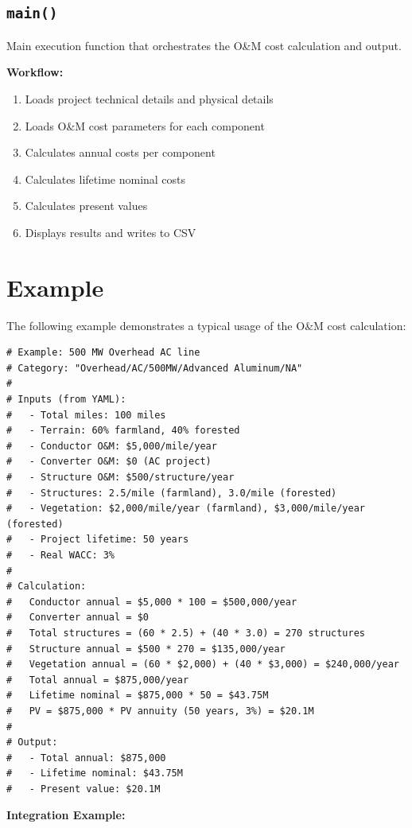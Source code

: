 \documentclass[ctcc_full_documentation.tex]{subfiles}
\begin{document}
\subsection{\texttt{main()}}

Main execution function that orchestrates the O\&M cost calculation and output.

\textbf{Workflow:}
\begin{enumerate}
    \item Loads project technical details and physical details
    \item Loads O\&M cost parameters for each component
    \item Calculates annual costs per component
    \item Calculates lifetime nominal costs
    \item Calculates present values
    \item Displays results and writes to CSV
\end{enumerate}

\section{Example}

The following example demonstrates a typical usage of the O\&M cost calculation:

\begin{lstlisting}
# Example: 500 MW Overhead AC line
# Category: "Overhead/AC/500MW/Advanced Aluminum/NA"
# 
# Inputs (from YAML):
#   - Total miles: 100 miles
#   - Terrain: 60% farmland, 40% forested
#   - Conductor O&M: $5,000/mile/year
#   - Converter O&M: $0 (AC project)
#   - Structure O&M: $500/structure/year
#   - Structures: 2.5/mile (farmland), 3.0/mile (forested)
#   - Vegetation: $2,000/mile/year (farmland), $3,000/mile/year (forested)
#   - Project lifetime: 50 years
#   - Real WACC: 3%
#
# Calculation:
#   Conductor annual = $5,000 * 100 = $500,000/year
#   Converter annual = $0
#   Total structures = (60 * 2.5) + (40 * 3.0) = 270 structures
#   Structure annual = $500 * 270 = $135,000/year
#   Vegetation annual = (60 * $2,000) + (40 * $3,000) = $240,000/year
#   Total annual = $875,000/year
#   Lifetime nominal = $875,000 * 50 = $43.75M
#   PV = $875,000 * PV annuity (50 years, 3%) = $20.1M
#
# Output:
#   - Total annual: $875,000
#   - Lifetime nominal: $43.75M
#   - Present value: $20.1M
\end{lstlisting}

\textbf{Integration Example:}
\end{document}
